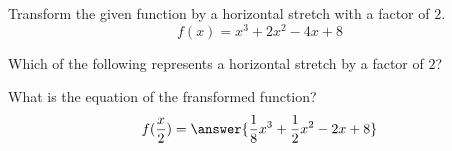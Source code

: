 \documentclass{ximera}
\author{Ivo Terek}
\begin{document}
Transform the given function by a horizontal stretch with a factor of $2$.
\[
f(x)=x^3+2x^2-4x+8
\]
\begin{exercise}
Which of the following represents a horizontal stretch by a factor of $2$?
\begin{multipleChoice}
\end{multipleChoice}

\begin{exercise}
What is the equation of the fransformed function?
\[
f(\frac{x}{2})=\answer{\frac{1}{8}x^3+\frac{1}{2}x^2-2x+8}
\]
\end{exercise}
\end{exercise}
\end{document}
